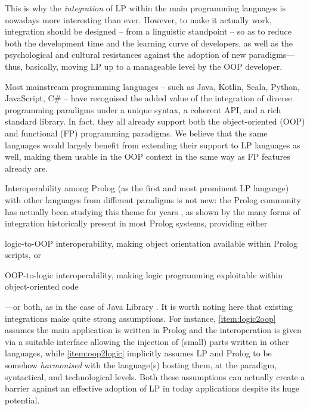 \documentclass[12pt,a4paper,openright,twoside]{book}
\begin{document}
This is why the \emph{integration} of LP within the main programming languages is  nowadays more interesting than ever.
%
However, to make it actually work, integration should be designed -- from a linguistic standpoint -- so as to reduce both the development time and the learning curve of developers, as well as the psychological and cultural resistances against the adoption of new paradigms---thus, basically, moving LP up to a manageable level by the OOP developer.

Most mainstream programming languages -- such as Java, Kotlin, Scala, Python, JavaScript, C\# -- have recognised the added value of the integration of diverse programming paradigms under a unique syntax, a coherent API, and a rich standard library.
%
In fact, they all already support both the object-oriented (OOP) and functional (FP) programming paradigms.
%
We believe that the same languages would largely benefit from extending their support to LP languages as well, making them usable in the OOP context in the same way as FP features already are.

Interoperability among Prolog \cite{ColmerauerR93} (as the first and most prominent LP language) with other languages from different paradigms is not new: the Prolog community has actually been studying this theme for years \cite{Bagnara2002}, as shown by the many forms of integration historically present in most Prolog systems, providing either
%
\begin{inlinelist}
    \item\label{item:logic2oop} logic-to-OOP interoperability, making object orientation available within Prolog scripts, or
    \item\label{item:oop2logic} OOP-to-logic interoperability, making logic programming exploitable within object-oriented code
\end{inlinelist}%
%
---or both, as in the case of \tuprolog{} Java Library \cite{tuprolog-scp57}.
%
It is worth noting here that existing integrations make quite strong assumptions.
%
For instance, \cref{item:logic2oop} assumes the main application is written in Prolog and the interoperation is given via a suitable interface allowing the injection of (small) parts written in other languages, while \cref{item:oop2logic} implicitly assumes LP and Prolog to be somehow \emph{harmonised} with the language(s) hosting them, at the paradigm, syntactical, and technological levels.
%
Both these assumptions can actually create a barrier against an effective adoption of LP in today applications despite its huge potential.
\end{document}
